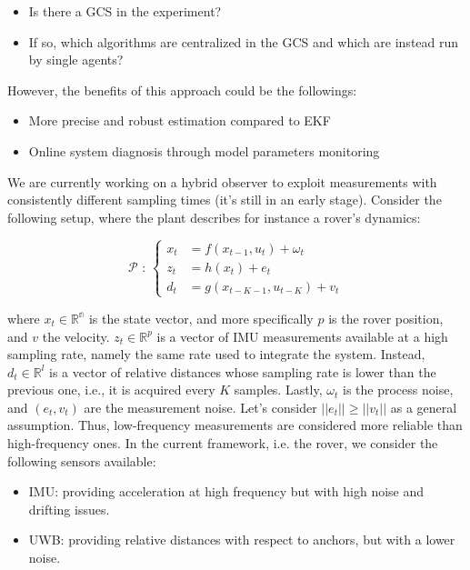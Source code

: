 \begin{itemize}
    \item Is there a GCS in the experiment?
    \item If so, which algorithms are centralized in the GCS and which are instead run by single agents?    
\end{itemize}

However, the benefits of this approach could be the followings:

\begin{itemize}
    \item More precise and robust estimation compared to EKF
    \item Online system diagnosis through model parameters monitoring
\end{itemize}

\label{par:hyb_obs}
\newline
We are currently working on a hybrid observer to exploit measurements with consistently different sampling times (it's still in an early stage). Consider the following setup, where the plant describes for instance a rover's dynamics: 

\begin{equation}
    \label{eqn:multirate_ss}
    \mathcal{P} \text{ : }    
    \begin{cases}
        x_t &= f(x_{t-1},u_t) + \omega_t \\
        z_t &= h(x_t) + e_t \\
        d_{t} &= g(x_{t-K-1},u_{t-K}) + v_t
    \end{cases}
\end{equation}

where $x_t\in\mathbb{R^n}$ is the state vector, and more specifically $p$ is the rover position, and $v$ the velocity. $z_t\in\mathbb{R}^p$ is a vector of IMU measurements available at a high sampling rate, namely the same rate used to integrate the system. Instead, $d_t\in\mathbb{R}^l$ is a vector of relative distances whose sampling rate is lower than the previous one, i.e., it is acquired every $K$ samples. Lastly, $\omega_t$ is the process noise, and $(e_t,v_t)$ are the measurement noise. Let's consider $||e_t|| \geq ||v_t||$ as a general assumption. Thus, low-frequency measurements are considered more reliable than high-frequency ones. In the current framework, i.e. the rover, we consider the following sensors available: 

\begin{itemize}
    \item IMU: providing acceleration at high frequency but with high noise and drifting issues.
    \item UWB: providing relative distances with respect to anchors, but with a lower noise.
\end{itemize}

